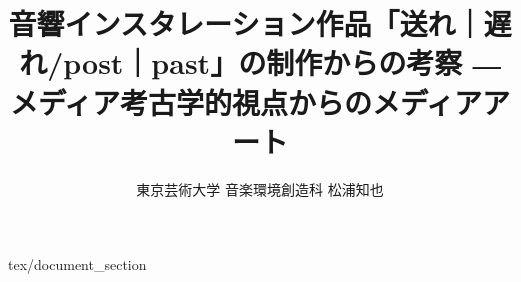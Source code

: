 \documentclass[report]{jsbook}
\title {音響インスタレーション作品「送れ｜遅れ/post｜past」の制作からの考察 ―メディア考古学的視点からのメディアアート}
\author {東京芸術大学 音楽環境創造科 松浦知也}
\begin{document}
\maketitle

\tableofcontents

 {tex/document_section}




\end{document}
